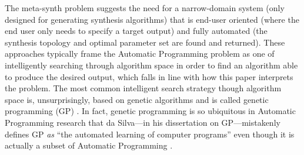 \documentclass[a4paper,12pt]{report} 	%
\numberwithin{figure}{chapter}
\numberwithin{table}{chapter}
\numberwithin{equation}{chapter}
\begin{document}
\begin{flushleft}
The meta-synth problem suggests the need for a narrow-domain system (only designed for generating synthesis algorithms) that is end-user oriented (where the end user only needs to specify a target output) and fully automated (the synthesis topology and optimal parameter set are found and returned). These approaches typically frame the Automatic Programming problem as one of intelligently searching through algorithm space in order to find an algorithm able to produce the desired output, which falls in line with how this paper interprets the problem. The most common intelligent search strategy though algorithm space is, unsurprisingly, based on genetic algorithms and is called genetic programming (GP) \cite{Koza:1992g}. In fact, genetic programming is so ubiquitous in Automatic Programming research that da Silva---in his dissertation on GP---mistakenly defines GP \emph{as} ``the automated learning of computer programs'' even though it is actually a subset of Automatic Programming \cite[p. ix]{Silva:2008le}.


\end{flushleft}
\end{document}
